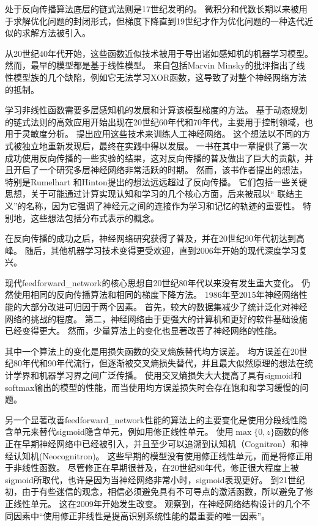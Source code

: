   
处于反向传播算法底层的链式法则是17世纪发明的\citep{Leibniz-1676,LHopital-1696}。
微积分和代数长期以来被用于求解优化问题的封闭形式，但梯度下降直到19世纪才作为优化问题的一种迭代近似的求解方法被引入\citep{cauchy1847}。

从20世纪40年代开始，这些函数近似技术被用于导出诸如感知机的机器学习模型。 
然而，最早的模型都是基于线性模型。 
来自包括Marvin Minsky的批评指出了线性模型族的几个缺陷，例如它无法学习XOR函数，这导致了对整个神经网络方法的抵制。

学习非线性函数需要多层感知机的发展和计算该模型梯度的方法。
基于动态规划的链式法则的高效应用开始出现在20世纪60年代和70年代，主要用于控制领域\citep{Kelley-1960,Bryson-et-al-1961,Dreyfus-1962,Bryson-1969,Dreyfus-1973}，也用于灵敏度分析\citep{Linnainmaa-1976}。 
\cite{Werbos-1981}提出应用这些技术来训练人工神经网络。
这个想法以不同的方式被独立地重新发现后\citep{LeCun85,Parker-1985,Rumelhart86b-small}，最终在实践中得以发展。
一书在其中一章提供了第一次成功使用反向传播的一些实验的结果\citep{Rumelhart86c}，这对反向传播的普及做出了巨大的贡献，并且开启了一个研究多层神经网络非常活跃的时期。
然而，该书作者提出的想法，特别是Rumelhart 和Hinton提出的想法远远超过了反向传播。
它们包括一些关键思想，关于可能通过计算实现认知和学习的几个核心方面，后来被冠以`` 联结主义''的名称，因为它强调了神经元之间的连接作为学习和记忆的轨迹的重要性。
特别地，这些想法包括分布式表示的概念\citep{Hinton-et-al-PDP1986}。

在反向传播的成功之后，神经网络研究获得了普及，并在20世纪90年代初达到高峰。 
随后，其他机器学习技术变得更受欢迎，直到2006年开始的现代深度学习复兴。

现代\gls{feedforward_network}的核心思想自20世纪80年代以来没有发生重大变化。
仍然使用相同的反向传播算法和相同的梯度下降方法。
1986年至2015年神经网络性能的大部分改进可归因于两个因素。
首先，较大的数据集减少了统计泛化对神经网络的挑战的程度。
第二，神经网络由于更强大的计算机和更好的软件基础设施已经变得更大。
然而，少量算法上的变化也显著改善了神经网络的性能。
  
  
其中一个算法上的变化是用损失函数的交叉熵族替代均方误差。
均方误差在20世纪80年代和90年代流行，但逐渐被交叉熵损失替代，并且最大似然原理的想法在统计学界和机器学习界之间广泛传播。
使用交叉熵损失大大提高了具有sigmoid和softmax输出的模型的性能，而当使用均方误差损失时会存在饱和和学习缓慢的问题。

另一个显著改善\gls{feedforward_network}性能的算法上的主要变化是使用分段线性隐含单元来替代sigmoid隐含单元，例如用修正线性单元。
使用$\max\{0, z\}$函数的修正在早期神经网络中已经被引入，并且至少可以追溯到认知机（Cognitron）和神经认知机(Neocognitron)\citep{Fukushima75,Fukushima80}。
这些早期的模型没有使用修正线性单元，而是将修正用于非线性函数。
尽管修正在早期很普及，在20世纪80年代，修正很大程度上被sigmoid所取代，也许是因为当神经网络非常小时，sigmoid表现更好。
到21世纪初，由于有些迷信的观念，相信必须避免具有不可导点的激活函数，所以避免了修正线性单元。
这在2009年开始发生改变。
\cite{Jarrett-ICCV2009-small}观察到，在神经网络结构设计的几个不同因素中``使用修正非线性是提高识别系统性能的最重要的唯一因素''。

